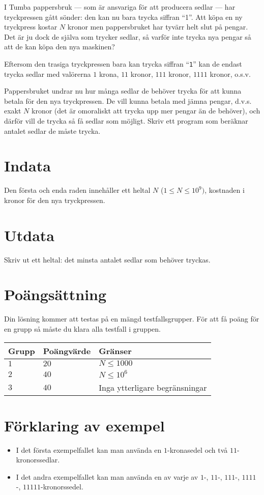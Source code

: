 I Tumba pappersbruk --- som är ansvariga för att producera sedlar --- har tryckpressen gått sönder: den kan nu bara trycka siffran ``1''.
Att köpa en ny tryckpress kostar $N$ kronor men pappersbruket har tyvärr helt slut på pengar.
Det är ju dock de själva som trycker sedlar, så varför inte trycka nya pengar så att de kan köpa den nya maskinen?

Eftersom den trasiga tryckpressen bara kan trycka siffran ``\texttt{1}'' kan de endast trycka sedlar med valörerna $1$ krona, $11$ kronor, $111$ kronor, $1111$ kronor, o.s.v.

Pappersbruket undrar nu hur många sedlar de behöver trycka för att kunna betala för den nya tryckpressen.
De vill kunna betala med jämna pengar, d.v.s. exakt $N$ kronor (det är omoraliskt att trycka upp mer pengar än de behöver), och därför vill de trycka så få sedlar som möjligt.
Skriv ett program som beräknar antalet sedlar de måste trycka.

\section*{Indata}
Den första och enda raden innehåller ett heltal $N$ ($1 \le N \le 10^9)$, kostnaden i kronor för den nya tryckpressen.

\section*{Utdata}
Skriv ut ett heltal: det minsta antalet sedlar som behöver tryckas.

\section*{Poängsättning}
Din lösning kommer att testas på en mängd testfallsgrupper.
För att få poäng för en grupp så måste du klara alla testfall i gruppen.

\noindent
\begin{tabular}{| l | l | l |}
  \hline
  Grupp & Poängvärde & Gränser \\ \hline
  $1$    & $20$        &  $ N \leq 1000 $ \\ \hline 
  $2$    & $40$        &  $ N \leq 10^6 $ \\ \hline
  $3$    & $40$        &  Inga ytterligare begränsningar \\ \hline
\end{tabular}

\section*{Förklaring av exempel}
\begin{itemize}
  \item I det första exempelfallet kan man använda en $1$-kronasedel och två $11$-kronorssedlar.
  \item I det andra exempelfallet kan man använda en av varje av $1$-, $11$-, $111$-, $1111$-, $11111$-kronorssedel.
\end{itemize}
